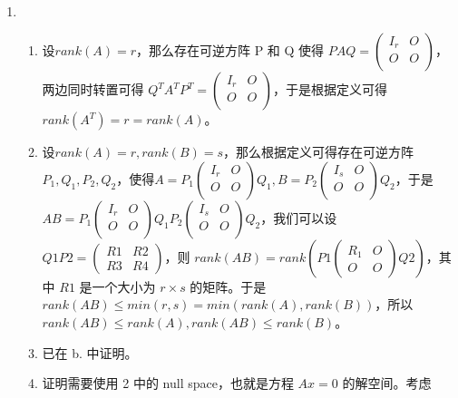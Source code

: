 \documentclass[11pt,letter,notitlepage]{article}
\begin{document}
\begin{solution}
	\heiti
	\ \\
	\begin{enumerate}
		\item \ \\
		\begin{enumerate}
			\item 设$ rank(A) = r$，那么存在可逆方阵 P 和 Q 使得 $PAQ = \begin{pmatrix} I_r & O \\ O & O \\ \end{pmatrix}$，两边同时转置可得 $ Q^TA^TP^T = \begin{pmatrix} I_r & O\\ O & O \\ \end{pmatrix} $，于是根据定义可得 $ rank(A^T) = r = rank(A)$。
			\item 设$ rank(A) = r, rank(B) = s$，那么根据定义可得存在可逆方阵 $ P_1, Q_1, P_2, Q_2$，使得$ A = P_1 \begin{pmatrix} I_r & O \\ O & O \\ \end{pmatrix} Q_1, B = P_2 \begin{pmatrix} I_s & O \\ O & O \\ \end{pmatrix} Q_2$，于是 $ AB = P_1 \begin{pmatrix} I_r & O \\ O & O \\ \end{pmatrix} Q_1 P_2 \begin{pmatrix} I_s & O \\ O & O \\ \end{pmatrix} Q_2$，我们可以设 $Q1P2 = \begin{pmatrix} R1 & R2 \\ R3 & R4 \end{pmatrix}$，则 $rank(AB) = rank(P1\begin{pmatrix} R_1 & O \\ O & O \end{pmatrix}Q2)$，其中 $R1$ 是一个大小为 ${r \times s}$ 的矩阵。于是 $rank(AB) \leq min(r, s) = min(rank(A), rank(B))$，所以 $ rank(AB) \leq rank(A), rank(AB) \leq rank(B)$。
			\item 已在 b. 中证明。
			\item 证明需要使用 2 中的 null space，也就是方程 $ Ax=0 $ 的解空间。考虑 

\end{enumerate}
\end{enumerate}
\end{solution}
\end{document}

